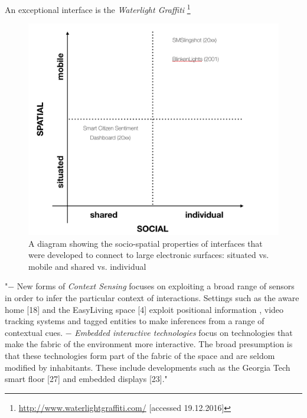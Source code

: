 An exceptional interface is the \textit{Waterlight Graffiti}  \footnote{\url{http://www.waterlightgraffiti.com/} [accessed 19.12.2016]}

\begin{figure}[htp]
  \centering
  \includegraphics[width=12cm]{Illustrations/interfaces_diagram.png}
  \caption[Interfaces]{A diagram showing the socio-spatial properties of interfaces that were developed to connect to large electronic surfaces: situated vs. mobile and shared vs. individual}
  \label{InterfacesDiagram}
  \end{figure}

"− New forms of \textit{Context Sensing} focuses on exploiting a broad range of sensors in order to infer the particular context of interactions. Settings such as the aware home [18] and the EasyLiving space [4] exploit positional information , video tracking systems and tagged entities to make inferences from a range of contextual cues.
− \textit{Embedded interactive technologies} focus on technologies that make the fabric of the environment more interactive. The broad presumption is that these technologies form part of the fabric of the space and are seldom modified by inhabitants.
These include
developments such as the Georgia Tech smart floor [27] and embedded displays [23]." 


